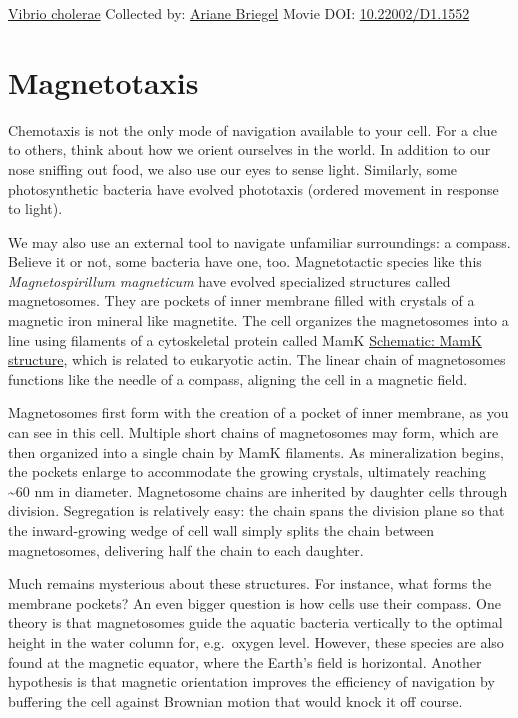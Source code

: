 \documentclass[]{tufte-book}
\begin{document}
\hypertarget{htmlwidget-986eddf0315ee7525505}{}

\label{fig:7-5a}\protect\hyperlink{tree}{Vibrio cholerae} Collected by: \protect\hyperlink{ariane_briegel}{Ariane Briegel} Movie DOI: \href{https://doi.org/10.22002/D1.1552}{10.22002/D1.1552}

\hypertarget{magnetotaxis}{%
\section{Magnetotaxis}\label{magnetotaxis}}

Chemotaxis is not the only mode of navigation available to your cell. For a clue to others, think about how we orient ourselves in the world. In addition to our nose sniffing out food, we also use our eyes to sense light. Similarly, some photosynthetic bacteria have evolved phototaxis (ordered movement in response to light).

We may also use an external tool to navigate unfamiliar surroundings: a compass. Believe it or not, some bacteria have one, too. Magnetotactic species like this \emph{Magnetospirillum magneticum} have evolved specialized structures called magnetosomes. They are pockets of inner membrane filled with crystals of a magnetic iron mineral like magnetite. The cell organizes the magnetosomes into a line using filaments of a cytoskeletal protein called MamK \protect\hyperlink{MamK_structure}{Schematic: MamK structure}, which is related to eukaryotic actin. The linear chain of magnetosomes functions like the needle of a compass, aligning the cell in a magnetic field.

Magnetosomes first form with the creation of a pocket of inner membrane, as you can see in this cell. Multiple short chains of magnetosomes may form, which are then organized into a single chain by MamK filaments. As mineralization begins, the pockets enlarge to accommodate the growing crystals, ultimately reaching \textasciitilde{}60 nm in diameter. Magnetosome chains are inherited by daughter cells through division. Segregation is relatively easy: the chain spans the division plane so that the inward-growing wedge of cell wall simply splits the chain between magnetosomes, delivering half the chain to each daughter.

Much remains mysterious about these structures. For instance, what forms the membrane pockets? An even bigger question is how cells use their compass. One theory is that magnetosomes guide the aquatic bacteria vertically to the optimal height in the water column for, e.g.~oxygen level. However, these species are also found at the magnetic equator, where the Earth's field is horizontal. Another hypothesis is that magnetic orientation improves the efficiency of navigation by buffering the cell against Brownian motion that would knock it off course.
\end{document}
